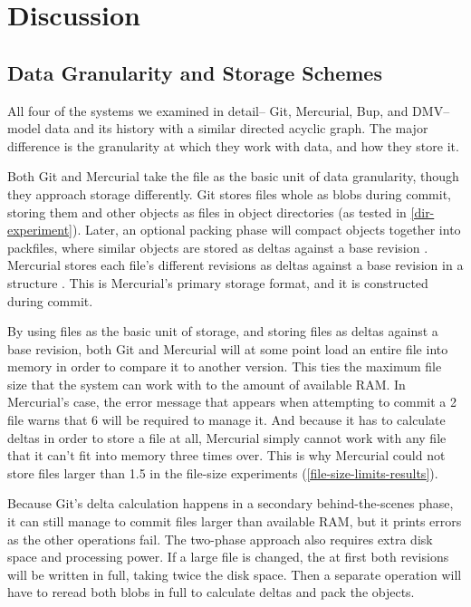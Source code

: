\chapter{Discussion}


\section{Data Granularity and Storage Schemes}
\label{chunk-then-recombine}

All four of the systems we examined in detail-- Git, Mercurial, Bup, and
\gls{DMV}-- model data and its history with a similar directed acyclic graph.
The major difference is the granularity at which they work with data, and how
they store it.

Both Git and Mercurial take the file as the basic unit of data granularity,
though they approach storage differently. Git stores files whole as \glspl{blob}
during \gls{commit}, storing them and other objects as files in object
directories (as tested in \autoref{dir-experiment}). Later, an optional packing
phase will compact objects together into \glspl{packfile}, where similar
objects are stored as deltas against a base revision \cite[Section
10.4]{git_book}. Mercurial stores each file's different revisions as deltas
   against a base revision in a  structure \cite[Chapter
   4]{hgbook}. This is Mercurial's primary storage format, and it is constructed
   during \gls{commit}.

By using files as the basic unit of storage, and storing files as deltas against
a base revision, both Git and Mercurial will at some point load an entire file
into memory in order to compare it to another version. This ties the maximum
file size that the system can work with to the amount of available RAM. In
Mercurial's case, the error message that appears when attempting to \gls{commit} a
\SI{2}{\gib} file warns that \SI{6}{\gib} will be required to manage it. And
because it has to calculate deltas in order to store a file at all, Mercurial
simply cannot work with any file that it can't fit into memory three times over.
This is why Mercurial could not store files larger than \SI{1.5}{\gib} in the
file-size experiments (\autoref{file-size-limits-results}).

Because Git's delta calculation happens in a secondary behind-the-scenes phase,
it can still manage to \gls{commit} files larger than available RAM, but it
prints errors as the other operations fail. The two-phase approach also requires
extra disk space and processing power. If a large file is changed, the at first
both revisions will be written in full, taking twice the disk space. Then a
separate operation will have to reread both \glspl{blob} in full to calculate
deltas and pack the objects.


